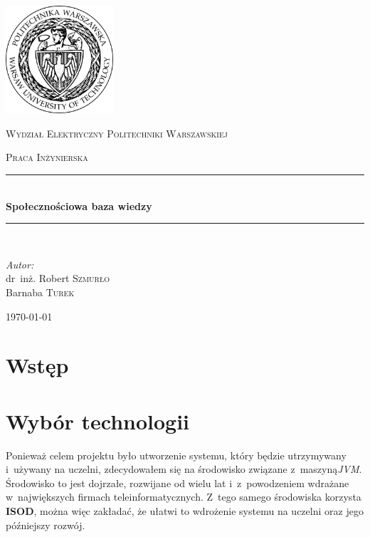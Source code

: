 \documentclass[a4paper]{article}
\newcommand{\HRule}{\rule{\linewidth}{0.5mm}}
\newcommand{\isod}{\textbf{ISOD}}
\begin{document}
\begin{titlepage}

  \begin{center}


    \includegraphics[width=0.3\textwidth]{logo.jpg}\\[1cm]

    \begin{onehalfspace}
      \textsc{\LARGE Wydział Elektryczny Politechniki Warszawskiej}\\[1.5cm]
    \end{onehalfspace}



    \textsc{\Large Praca Inżynierska}\\[0.5cm]

    \HRule \\[0.4cm]
    {\huge \bfseries Społecznościowa baza wiedzy}\\[0.2cm]
    \HRule \\[1.5cm]

    \begin{flushleft} \large
      \emph{Autor:}\\
      dr~inż. Robert \textsc{Szmurło} \\
      Barnaba \textsc{Turek}
    \end{flushleft}
    \vfill

    {\large \today}

  \end{center}

\end{titlepage}
\sloppy

\setcounter{tocdepth}{4}
\tableofcontents

\section{Wstęp}
\section{Wybór technologii}
Ponieważ celem projektu było utworzenie systemu, który będzie utrzymywany i~używany na uczelni, zdecydowałem się na środowisko związane z~maszyną\emph{JVM}.
Środowisko to jest dojrzałe, rozwijane od wielu lat i~z~powodzeniem wdrażane w~największych firmach teleinformatycznych.
Z~tego samego środowiska korzysta \isod, można więc zakładać, że ułatwi to wdrożenie systemu na uczelni oraz jego późniejszy rozwój.
\end{document}
